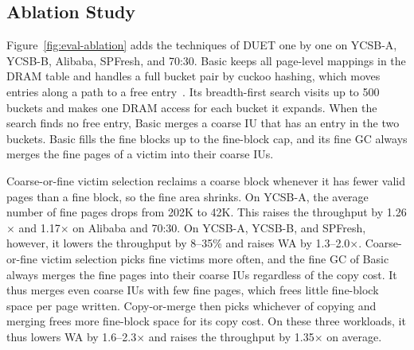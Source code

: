 \subsection{Ablation Study}
\label{sec:ablation}
Figure~\ref{fig:eval-ablation} adds the techniques of DUET one by one on YCSB-A,
YCSB-B, Alibaba, SPFresh, and 70:30. Basic keeps all page-level mappings in the DRAM
table and handles a full bucket pair by cuckoo hashing, which moves entries along a
path to a free entry~\cite{cuckoo,bfscuckoo}. Its breadth-first search visits up to
500 buckets and makes one DRAM access for each bucket it expands. When the
search finds no free entry, Basic merges a coarse IU that has an entry in the two
buckets. Basic fills the fine blocks up to the fine-block cap, and its fine GC always
merges the fine pages of a victim into their coarse IUs.

Coarse-or-fine victim selection reclaims a coarse block whenever it has fewer valid
pages than a fine block, so the fine area shrinks. On YCSB-A, the average number of
fine pages drops from 202K to 42K. This raises the throughput by 1.26$\times$ and
1.17$\times$ on Alibaba and 70:30. On YCSB-A, YCSB-B, and SPFresh, however, it lowers
the throughput by 8--35\% and raises WA by 1.3--2.0$\times$. Coarse-or-fine victim
selection picks fine victims more often, and the fine GC of Basic always merges the
fine pages into their coarse IUs regardless of the copy cost. It thus merges even
coarse IUs with few fine pages, which frees little fine-block space per page written.
Copy-or-merge then picks whichever of copying and merging frees more
fine-block space for its copy cost. On these three workloads, it thus lowers WA by
1.6--2.3$\times$ and raises the throughput by 1.35$\times$ on average.

